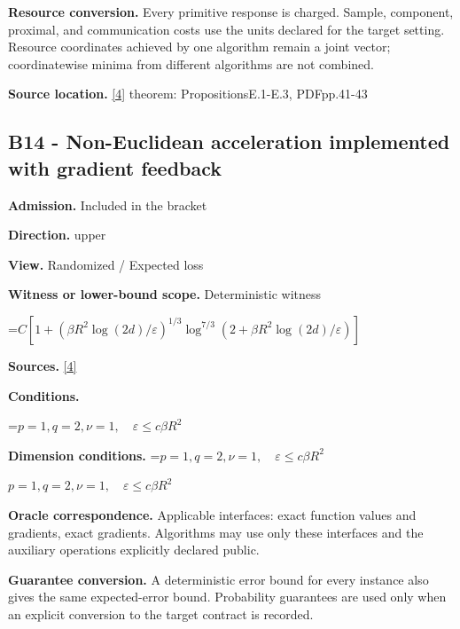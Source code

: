 \documentclass[10pt,a4paper]{article}
\newcommand{\AtlasMath}[1]{\par\begingroup\centering\setbox0=\hbox{$\displaystyle #1$}\ifdim\wd0>1.4\linewidth\typeout{ATLAS WIDE FORMULA: \the\wd0}\fi\ifdim\wd0>\linewidth\resizebox{\linewidth}{!}{\box0}\else\box0\fi\par\endgroup}
\newcommand{\AtlasInlineMath}[1]{\begingroup\setbox0=\hbox{$#1$}\ifdim\wd0>.4\linewidth\endgroup\AtlasMath{#1}\else\endgroup$#1$\fi}
\begin{document}
\textbf{Resource conversion.} Every primitive response is charged. Sample, component, proximal, and communication costs use the units declared for the target setting. Resource coordinates achieved by one algorithm remain a joint vector; coordinatewise minima from different algorithms are not combined.



\textbf{Source location.} \href{https://arxiv.org/pdf/2609.32910}{[4]} theorem: PropositionsE.1-E.3, PDFpp.41-43



\subsection{B14 - Non-Euclidean acceleration implemented with gradient feedback}


\textbf{Admission.} Included in the bracket



\textbf{Direction.} upper



\textbf{View.} Randomized / Expected loss



\textbf{Witness or lower-bound scope.} Deterministic witness



\AtlasMath{C[1+(\beta R^2\log(2d)/\varepsilon)^{1/3}\log^{7/3}(2+\beta R^2\log(2d)/\varepsilon)]}


\textbf{Sources.} \href{https://arxiv.org/pdf/2609.32910}{[4]}



\textbf{Conditions.}
\AtlasMath{p=1,q=2,\nu=1,\quad\varepsilon\le c\beta R^2}




\textbf{Dimension conditions.} \AtlasInlineMath{p=1,q=2,\nu=1,\quad\varepsilon\le c\beta R^2}



\textbf{Oracle correspondence.} Applicable interfaces: exact function values and gradients, exact gradients. Algorithms may use only these interfaces and the auxiliary operations explicitly declared public.



\textbf{Guarantee conversion.} A deterministic error bound for every instance also gives the same expected-error bound. Probability guarantees are used only when an explicit conversion to the target contract is recorded.
\end{document}
